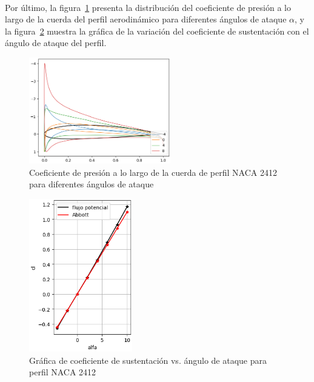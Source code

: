 \documentclass[letterpaper, openright, 12pt]{book}
\begin{document}
    \paragraph*{}
    Por último, la figura~\ref{fig:potential_flow_2412_cp_dist} presenta la
    distribución del coeficiente de presión a lo largo de la cuerda del perfil
    aerodinámico para diferentes ángulos de ataque $\alpha$, y la
    figura~\ref{fig:potential_flow_2412_cl} muestra la gráfica de la variación
    del coeficiente de sustentación con el ángulo de ataque del perfil.
    \begin{figure}[H]%
        \centering
        \includegraphics[keepaspectratio,
            width=0.55\textwidth]{./img/potential_flow_2412_cps}
        \caption[Coeficiente de presión a lo largo de la cuerda de perfil NACA
            2412]{Coeficiente de presión a lo largo de la cuerda de perfil
            NACA 2412 para diferentes ángulos de ataque}
        \label{fig:potential_flow_2412_cp_dist}
    \end{figure}

    \begin{figure}[H]%
        \centering
        \includegraphics[keepaspectratio,
            width=0.4\textwidth]{./img/potential_flow_2412_cl}
        \caption{Gráfica de coeficiente de sustentación vs. ángulo de ataque
            para perfil NACA 2412}
        \label{fig:potential_flow_2412_cl}
    \end{figure}
\end{document}
